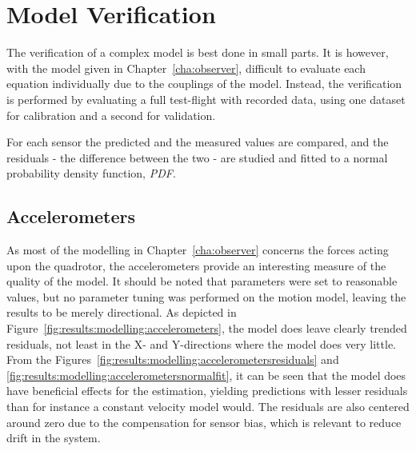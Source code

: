 \section{Model Verification}
\label{sec:results:modelling}
    The verification of a complex model is best done in small parts.
    It is however, with the model given in Chapter~\ref{cha:observer},
    difficult to evaluate each equation individually due to the couplings of the model.
    Instead, the verification is performed by evaluating a full test-flight
    with recorded data, using one dataset for calibration and a second for validation.

    For each sensor the predicted and the measured values are compared,
    and the residuals - the difference between the two - are studied and
    fitted to a normal probability density function, \textit{PDF}.

    \subsection{Accelerometers}
        \label{ssec:results:modelling:accelerometers}
        As most of the modelling in Chapter~\ref{cha:observer} concerns
        the forces acting upon the quadrotor, the accelerometers
        provide an interesting measure of the quality of the model.
        It should be noted that parameters were set to reasonable values,
        but no parameter tuning was performed on the motion model,
        leaving the results to be merely directional.
        As depicted in Figure~\ref{fig:results:modelling:accelerometers},
        the model does leave clearly trended residuals, not least in the
        X- and Y-directions where the model does very little.
        From the Figures~\ref{fig:results:modelling:accelerometersresiduals} and \ref{fig:results:modelling:accelerometersnormalfit},
        it can be seen that the model does have beneficial
        effects for the estimation, yielding predictions with lesser residuals
        than for instance a constant velocity model would.
        The residuals are also centered around zero due to the compensation
        for sensor bias, which is relevant to reduce drift in the system.

